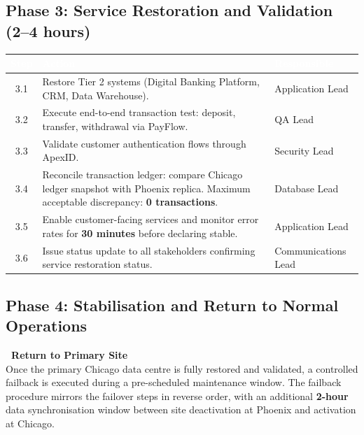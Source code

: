 \subsection{Phase 3: Service Restoration and Validation (2--4 hours)}

\begin{tabularx}{\textwidth}{@{}c X l@{}}
  \toprule
  \rowcolor{tablehead}
  \textcolor{white}{\textbf{Step}} & \textcolor{white}{\textbf{Action}} & \textcolor{white}{\textbf{Responsible}}\\
  \midrule
  3.1 & Restore Tier 2 systems (Digital Banking Platform, CRM, Data Warehouse). & Application Lead\\
  \rowcolor{tablerow}
  3.2 & Execute end-to-end transaction test: deposit, transfer, withdrawal via PayFlow. & QA Lead\\
  3.3 & Validate customer authentication flows through ApexID. & Security Lead\\
  \rowcolor{tablerow}
  3.4 & Reconcile transaction ledger: compare Chicago ledger snapshot with Phoenix replica. Maximum acceptable discrepancy: \textbf{0 transactions}. & Database Lead\\
  3.5 & Enable customer-facing services and monitor error rates for \textbf{30 minutes} before declaring stable. & Application Lead\\
  \rowcolor{tablerow}
  3.6 & Issue status update to all stakeholders confirming service restoration status. & Communications Lead\\
  \bottomrule
\end{tabularx}

\subsection{Phase 4: Stabilisation and Return to Normal Operations}

\begin{infobox}
\textbf{\faClock\ Return to Primary Site}\\[4pt]
Once the primary Chicago data centre is fully restored and validated, a controlled failback is executed during a pre-scheduled maintenance window. The failback procedure mirrors the failover steps in reverse order, with an additional \textbf{2-hour} data synchronisation window between site deactivation at Phoenix and activation at Chicago.
\end{infobox}

\clearpage
